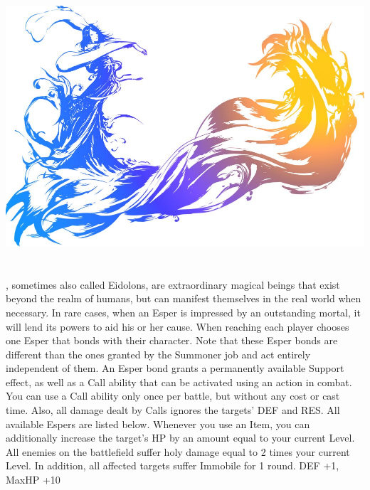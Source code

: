 %
\\\\\\
%
\includegraphics[width=\columnwidth]{./art/images/ff10.jpg}\\\\\\
%
, sometimes also called Eidolons, are extraordinary magical beings that exist beyond the realm of humans, but can manifest themselves in the real world when necessary.
In rare cases, when an Esper is impressed by an outstanding mortal, it will lend its powers to aid his or her cause.
When reaching  each player chooses one Esper that bonds with their character.
Note that these Esper bonds are different than the ones granted by the Summoner job and act entirely independent of them.
An Esper bond grants a permanently available Support effect, as well as a Call ability that can be activated using an action in combat. 
You can use a Call ability only once per battle, but without any cost or cast time.
Also, all damage dealt by Calls ignores the targets' DEF and RES.
All available Espers are listed below.
%
\vfill
%
{Whenever you use an Item, you can additionally increase the target's HP by an amount equal to your current Level.}
{All enemies on the battlefield suffer holy damage equal to 2 times your current Level. In addition, all affected targets suffer Immobile for 1 round.}
{DEF +1, MaxHP +10}
%
\vfill
%
